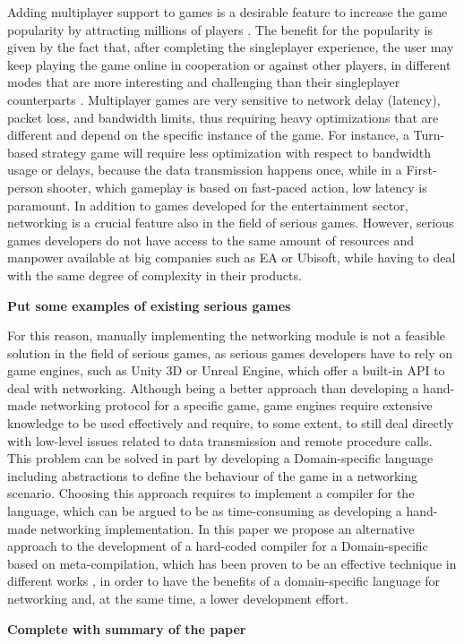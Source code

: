 Adding multiplayer support to games is a desirable feature to increase the game popularity by attracting millions of players \cite{ducheneaut2006alone}. The benefit for the popularity is given by the fact that, after completing the singleplayer experience, the user may keep playing the game online in cooperation or against other players, in different modes that are more interesting and challenging than their singleplayer counterparts \cite{pantel2002impact}. Multiplayer games are very sensitive to network delay (latency), packet loss, and bandwidth limits, thus requiring heavy optimizations that are different and depend on the specific instance of the game. For instance, a Turn-based strategy game will require less optimization with respect to bandwidth usage or delays, because the data transmission happens once, while in a First-person shooter, which gameplay is based on fast-paced action, low latency is paramount. In addition to games developed for the entertainment sector, networking is a crucial feature also in the field of serious games. However, serious games developers do not have access to the same amount of resources and manpower available at big companies such as EA or Ubisoft, while having to deal with the same degree of complexity in their products.

\textbf{Put some examples of existing serious games}

 For this reason, manually implementing the networking module is not a feasible solution in the field of serious games, as serious games developers have to rely on game engines, such as Unity 3D or Unreal Engine, which offer a built-in API to deal with networking. Although being a better approach than developing a hand-made networking protocol for a specific game, game engines require extensive knowledge to be used effectively and require, to some extent, to still deal directly with low-level issues related to data transmission and remote procedure calls. This problem can be solved in part by developing a Domain-specific language including abstractions to define the behaviour of the game in a networking scenario. Choosing this approach requires to implement a compiler for the language, which can be argued to be as time-consuming as developing a hand-made networking implementation. In this paper we propose an alternative approach to the development of a hard-coded compiler for a Domain-specific based on meta-compilation, which has been proven to be an effective technique in different works \cite{kaagedal1998generating,DiGiacomo2017}, in order to have the benefits of a domain-specific language for networking and, at the same time, a lower development effort.
 
 \textbf{Complete with summary of the paper}